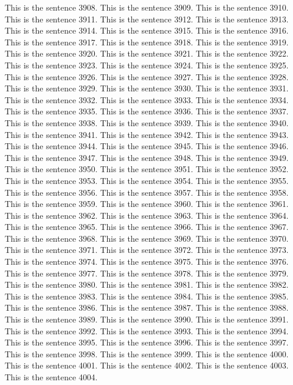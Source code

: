 \documentclass{article}
\begin{document}
This is the sentence 3908.
This is the sentence 3909.
This is the sentence 3910.
This is the sentence 3911.
This is the sentence 3912.
This is the sentence 3913.
This is the sentence 3914.
This is the sentence 3915.
This is the sentence 3916.
This is the sentence 3917.
This is the sentence 3918.
This is the sentence 3919.
This is the sentence 3920.
This is the sentence 3921.
This is the sentence 3922.
This is the sentence 3923.
This is the sentence 3924.
This is the sentence 3925.
This is the sentence 3926.
This is the sentence 3927.
This is the sentence 3928.
This is the sentence 3929.
This is the sentence 3930.
This is the sentence 3931.
This is the sentence 3932.
This is the sentence 3933.
This is the sentence 3934.
This is the sentence 3935.
This is the sentence 3936.
This is the sentence 3937.
This is the sentence 3938.
This is the sentence 3939.
This is the sentence 3940.
This is the sentence 3941.
This is the sentence 3942.
This is the sentence 3943.
This is the sentence 3944.
This is the sentence 3945.
This is the sentence 3946.
This is the sentence 3947.
This is the sentence 3948.
This is the sentence 3949.
This is the sentence 3950.
This is the sentence 3951.
This is the sentence 3952.
This is the sentence 3953.
This is the sentence 3954.
This is the sentence 3955.
This is the sentence 3956.
This is the sentence 3957.
This is the sentence 3958.
This is the sentence 3959.
This is the sentence 3960.
This is the sentence 3961.
This is the sentence 3962.
This is the sentence 3963.
This is the sentence 3964.
This is the sentence 3965.
This is the sentence 3966.
This is the sentence 3967.
This is the sentence 3968.
This is the sentence 3969.
This is the sentence 3970.
This is the sentence 3971.
This is the sentence 3972.
This is the sentence 3973.
This is the sentence 3974.
This is the sentence 3975.
This is the sentence 3976.
This is the sentence 3977.
This is the sentence 3978.
This is the sentence 3979.
This is the sentence 3980.
This is the sentence 3981.
This is the sentence 3982.
This is the sentence 3983.
This is the sentence 3984.
This is the sentence 3985.
This is the sentence 3986.
This is the sentence 3987.
This is the sentence 3988.
This is the sentence 3989.
This is the sentence 3990.
This is the sentence 3991.
This is the sentence 3992.
This is the sentence 3993.
This is the sentence 3994.
This is the sentence 3995.
This is the sentence 3996.
This is the sentence 3997.
This is the sentence 3998.
This is the sentence 3999.
This is the sentence 4000.
This is the sentence 4001.
This is the sentence 4002.
This is the sentence 4003.
This is the sentence 4004.
\end{document}
